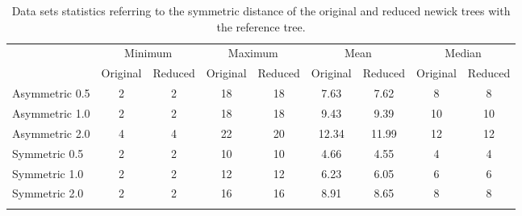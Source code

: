 \documentclass[12pt]{article}
\begin{document}
\begin{table}[H]
	\caption{Data sets statistics referring to the symmetric distance of the original and reduced newick trees with the reference tree.}	 
	\begin{adjustwidth}{-1cm}{}   
	\small\addtolength{\tabcolsep}{-3pt}
	\begin{tabular}{lcccccccc}
		\cline{2-9}
		\multicolumn{1}{c|}{\textbf{}} & \multicolumn{2}{c|}{Minimum} & \multicolumn{2}{c|}{Maximum} & \multicolumn{2}{c|}{Mean} & \multicolumn{2}{c|}{Median} \\ \cline{2-9} 
		\multicolumn{1}{l|}{\textbf{}} & \multicolumn{1}{l|}{Original} & \multicolumn{1}{l|}{Reduced} & \multicolumn{1}{l|}{Original} & \multicolumn{1}{l|}{Reduced} & \multicolumn{1}{l|}{Original} & \multicolumn{1}{l|}{Reduced} & \multicolumn{1}{l|}{Original} & \multicolumn{1}{l|}{Reduced} \\ \hline
		\multicolumn{1}{|l|}{Asymmetric 0.5} & \multicolumn{1}{c|}{2} & \multicolumn{1}{c|}{2} & \multicolumn{1}{c|}{18} & \multicolumn{1}{c|}{18} & \multicolumn{1}{c|}{7.63} & \multicolumn{1}{c|}{7.62} & \multicolumn{1}{c|}{8} & \multicolumn{1}{c|}{8} \\ \hline
		\multicolumn{1}{|l|}{Asymmetric 1.0} & \multicolumn{1}{c|}{2} & \multicolumn{1}{c|}{2} & \multicolumn{1}{c|}{18} & \multicolumn{1}{c|}{18} & \multicolumn{1}{c|}{9.43} & \multicolumn{1}{c|}{9.39} & \multicolumn{1}{c|}{10} & \multicolumn{1}{c|}{10} \\ \hline
		\multicolumn{1}{|l|}{Asymmetric 2.0} & \multicolumn{1}{c|}{4} & \multicolumn{1}{c|}{4} & \multicolumn{1}{c|}{22} & \multicolumn{1}{c|}{20} & \multicolumn{1}{c|}{12.34} & \multicolumn{1}{c|}{11.99} & \multicolumn{1}{c|}{12} & \multicolumn{1}{c|}{12} \\ \hline
		\multicolumn{1}{|l|}{Symmetric 0.5} & \multicolumn{1}{c|}{2} & \multicolumn{1}{c|}{2} & \multicolumn{1}{c|}{10} & \multicolumn{1}{c|}{10} & \multicolumn{1}{c|}{4.66} & \multicolumn{1}{c|}{4.55} & \multicolumn{1}{c|}{4} & \multicolumn{1}{c|}{4} \\ \hline
		\multicolumn{1}{|l|}{Symmetric 1.0} & \multicolumn{1}{c|}{2} & \multicolumn{1}{c|}{2} & \multicolumn{1}{c|}{12} & \multicolumn{1}{c|}{12} & \multicolumn{1}{c|}{6.23} & \multicolumn{1}{c|}{6.05} & \multicolumn{1}{c|}{6} & \multicolumn{1}{c|}{6} \\ \hline
		\multicolumn{1}{|l|}{Symmetric 2.0} & \multicolumn{1}{c|}{2} & \multicolumn{1}{c|}{2} & \multicolumn{1}{c|}{16} & \multicolumn{1}{c|}{16} & \multicolumn{1}{c|}{8.91} & \multicolumn{1}{c|}{8.65} & \multicolumn{1}{c|}{8} & \multicolumn{1}{c|}{8} \\ \hline
		& \multicolumn{1}{l}{} & \multicolumn{1}{l}{} & \multicolumn{1}{l}{} & \multicolumn{1}{l}{} & \multicolumn{1}{l}{} & \multicolumn{1}{l}{} & \multicolumn{1}{l}{} & \multicolumn{1}{l}{}
	\end{tabular}
	\label{table:statistics}
	 \end{adjustwidth}
\end{table}
\end{document}
